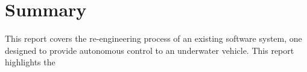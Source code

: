 \documentclass[
11pt, %
oneside, %
english, %
singlespacing, %
parskip, %
headsepline, %
chapterinoneline, %
]{MastersDoctoralThesis} %
\begin{document}

\tableofcontents %

\listoffigures %


\newpage
\section*{Summary}

This report covers the re-engineering process of an existing software system,
one designed to provide autonomous control to an underwater vehicle. This report
highlights the 

\printglossaries %


\mainmatter %

\pagestyle{thesis} %









\appendix %


%
%
%



\end{document}
